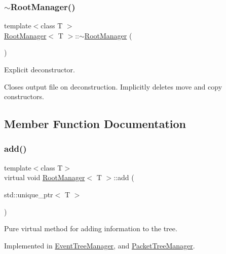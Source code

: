 \subsubsection{\texorpdfstring{$\sim$\+Root\+Manager()}{~RootManager()}}
{\footnotesize\ttfamily template$<$class T $>$ \\
\hyperlink{class_root_manager}{Root\+Manager}$<$ T $>$\+::$\sim$\hyperlink{class_root_manager}{Root\+Manager} (\begin{DoxyParamCaption}{ }\end{DoxyParamCaption})}



Explicit deconstructor. 

Closes output file on deconstruction. Implicitly deletes move and copy constructors. 

\subsection{Member Function Documentation}
\mbox{\label{class_root_manager_a2f05eb45d5eaee1f9f12e299395652fb}} 
\subsubsection{\texorpdfstring{add()}{add()}}
{\footnotesize\ttfamily template$<$class T$>$ \\
virtual void \hyperlink{class_root_manager}{Root\+Manager}$<$ T $>$\+::add (\begin{DoxyParamCaption}\item[{std\+::unique\+\_\+ptr$<$ T $>$}]{ }\end{DoxyParamCaption})\hspace{0.3cm}{\ttfamily [pure virtual]}}



Pure virtual method for adding information to the tree. 



Implemented in \hyperlink{class_event_tree_manager_acabb2f6c8dd0e08375b4cf8bf2c148fd}{Event\+Tree\+Manager}, and \hyperlink{class_packet_tree_manager_a855e71512fe6365c11f312584afff70a}{Packet\+Tree\+Manager}.

\mbox{\label{class_root_manager_aa1eaed1aa026059b8d00e729161c6a43}} 
